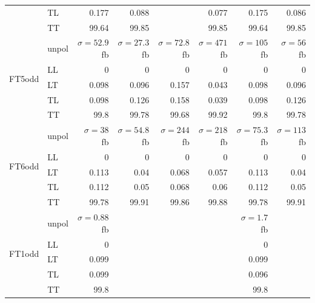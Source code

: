 \begin{table}[h]
{\begin{tabular}{llrrrrrr}
 & TL & \num{0.177} & \num{0.088} &  & \num{0.077} & \num{0.175} & \num{0.086} \\
 & TT & \num{99.64} & \num{99.85} &  & \num{99.85} & \num{99.64} & \num{99.85} \\
\midrule
\multirow{5}{*}{FT5odd}
 & unpol & $\sigma = \num{52.9}$ fb & $\sigma = \num{27.3}$ fb & $\sigma = \num{72.8}$ fb & $\sigma = \num{471}$ fb & $\sigma = \num{105}$ fb & $\sigma = \num{56}$ fb \\
 & LL & \num{0} & \num{0} & \num{0} & \num{0} & \num{0} & \num{0} \\
 & LT & \num{0.098} & \num{0.096} & \num{0.157} & \num{0.043} & \num{0.098} & \num{0.096} \\
 & TL & \num{0.098} & \num{0.126} & \num{0.158} & \num{0.039} & \num{0.098} & \num{0.126} \\
 & TT & \num{99.8} & \num{99.78} & \num{99.68} & \num{99.92} & \num{99.8} & \num{99.78} \\
\midrule
\multirow{5}{*}{FT6odd}
 & unpol & $\sigma = \num{38}$ fb & $\sigma = \num{54.8}$ fb & $\sigma = \num{244}$ fb & $\sigma = \num{218}$ fb & $\sigma = \num{75.3}$ fb & $\sigma = \num{113}$ fb \\
 & LL & \num{0} & \num{0} & \num{0} & \num{0} & \num{0} & \num{0} \\
 & LT & \num{0.113} & \num{0.04} & \num{0.068} & \num{0.057} & \num{0.113} & \num{0.04} \\
 & TL & \num{0.112} & \num{0.05} & \num{0.068} & \num{0.06} & \num{0.112} & \num{0.05} \\
 & TT & \num{99.78} & \num{99.91} & \num{99.86} & \num{99.88} & \num{99.78} & \num{99.91} \\
\midrule
\multirow{5}{*}{FT1odd}
 & unpol & $\sigma = \num{0.88}$ fb &  &  &  & $\sigma = \num{1.7}$ fb &  \\
 & LL & \num{0} &  &  &  & \num{0} &  \\
 & LT & \num{0.099} &  &  &  & \num{0.099} &  \\
 & TL & \num{0.099} &  &  &  & \num{0.096} &  \\
 & TT & \num{99.8} &  &  &  & \num{99.8} &  \\
\bottomrule
\end{tabular}
}%
\end{table}